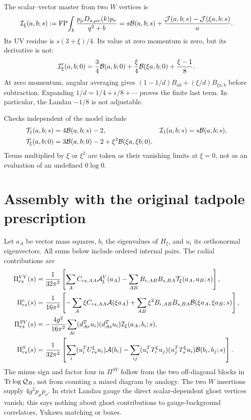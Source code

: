 \documentclass[11pt]{article}
\newcommand{\Tr}{\operatorname{Tr}}
\newcommand{\FP}{\operatorname{FP}}
\begin{document}
The scalar--vector master from two $W$ vertices is
\begin{equation}
 {\cal I}_\xi(a,b;s)
 :=\FP\!\int_k\frac{p_\mu D_{a,\mu\nu}(k)p_\nu}{q^2+b}
 =s{\cal B}(a,b;s)
       +\frac{{\cal J}(a,b;s)-{\cal J}(\xi a,b;s)}{a}.
 \label{eq:mixedmaster}
\end{equation}
Its UV residue is $s(3+\xi)/4$. Its value at zero momentum is zero,
but its derivative is not:
\begin{equation}
 {\cal I}'_\xi(a,b;0)
 =\frac34{\cal B}(a,b;0)
       +\frac{\xi}{4}{\cal B}(\xi a,b;0)+\frac{\xi-1}{8}.
 \label{eq:mixedslope}
\end{equation}
At zero momentum, angular averaging gives
$(1-1/d)B_{ab}+(\xi/d)B_{\xi a,b}$ before subtraction.
Expanding $1/d=1/4+\epsilon/8+\cdots$ proves the finite last term.
In particular, the Landau $-1/8$ is not adjustable.

Checks independent of the model include
\begin{align}
 {\cal T}_1(a,b;s)&=4{\cal B}(a,b;s)-2,&
 {\cal I}_1(a,b;s)&=s{\cal B}(a,b;s),\\
 {\cal T}_\xi(a,b;0)
 &=3{\cal B}(a,b;0)-2+\xi^2{\cal B}(\xi a,\xi b;0).
\end{align}
Terms multiplied by $\xi$ or $\xi^2$ are taken as their vanishing
limits at $\xi=0$, not as an evaluation of an undefined $0\log0$.

\section{Assembly with the original tadpole prescription}
Let $a_A$ be vector mass squares, $b_i$ the eigenvalues of $H_\xi$,
and $u_i$ its orthonormal eigenvectors. All sums below include ordered
internal pairs. The radial contributions are
\begin{align}
 \Pi^{VV}_{rs}(s)
 &=\frac1{32\pi^2}\left[
  \sum_A C_{rs,AA}{\cal A}^V_\xi(a_A)
  -\sum_{AB}B_{r,AB}B_{s,BA}{\cal T}_\xi(a_A,a_B;s)\right],\\
 \Pi^c_{rs}(s)
 &=\frac1{16\pi^2}\left[
  -\sum_A\xi C_{rs,AA}{\cal A}(\xi a_A)
  +\sum_{AB}\xi^2 B_{r,AB}B_{s,BA}
                         {\cal B}(\xi a_A,\xi a_B;s)\right],\\
 \Pi^{SV}_{rs}(s)
 &=-\frac{4g^2}{16\pi^2}\sum_{A i}
 (d_{Ar}^Tu_i)(d_{As}^Tu_i){\cal I}_\xi(a_A,b_i;s),\\
 \Pi^S_{rs}(s)
 &=\frac1{32\pi^2}\left[
 \sum_i (u_i^TU^\xi_{rs}u_i){\cal A}(b_i)
 -\sum_{ij}(u_i^TT^\xi_ru_j)(u_j^TT^\xi_su_i)
                           {\cal B}(b_i,b_j;s)\right].
\end{align}
The minus sign and factor four in $\Pi^{SV}$ follow from the two
off-diagonal blocks in $\Tr\log{\cal Q}_B$, not from counting a mixed
diagram by analogy. The two $W$ insertions supply $4g^2p_\mu p_\nu$.
In strict Landau gauge the direct scalar-dependent ghost vertices
vanish; this says nothing about ghost contributions to gauge-background
correlators, Yukawa matching or boxes.
\end{document}
